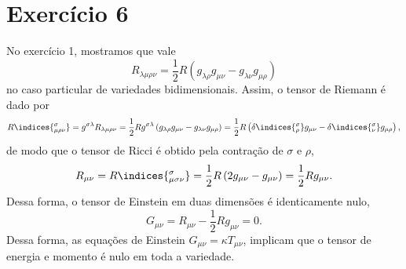 \section*{Exercício 6}
No exercício 1, mostramos que vale
\begin{equation*}
    R_{\lambda\mu\rho\nu} = \frac12 R \left(g_{\lambda\rho} g_{\mu\nu} - g_{\lambda\nu}g_{\mu\rho}\right)
\end{equation*}
no caso particular de variedades bidimensionais. Assim, o tensor de Riemann é dado por
\begin{equation*}
    R\indices{^\sigma_{\mu\rho\nu}} = g^{\sigma\lambda} R_{\lambda\mu\rho\nu} = \frac12 R g^{\sigma\lambda}\left(g_{\lambda\rho} g_{\mu\nu} - g_{\lambda\nu}g_{\mu\rho}\right) = \frac12 R\left(\delta\indices{^\sigma_\rho}g_{\mu\nu} - \delta\indices{^\sigma_\nu}g_{\mu\rho}\right),
\end{equation*}
de modo que o tensor de Ricci é obtido pela contração de \(\sigma\) e \(\rho\),
\begin{equation*}
    R_{\mu\nu} = R\indices{^\sigma_{\mu\sigma\nu}} = \frac12 R\left(2g_{\mu\nu} - g_{\mu\nu}\right) = \frac12 Rg_{\mu\nu}.
\end{equation*}
Dessa forma, o tensor de Einstein em duas dimensões é identicamente nulo,
\begin{equation*}
    G_{\mu\nu} = R_{\mu\nu} - \frac12 Rg_{\mu\nu} = 0.
\end{equation*}
Dessa forma, as equações de Einstein \(G_{\mu\nu} = \kappa T_{\mu\nu}\), implicam que o tensor de energia e momento é nulo em toda a variedade.
